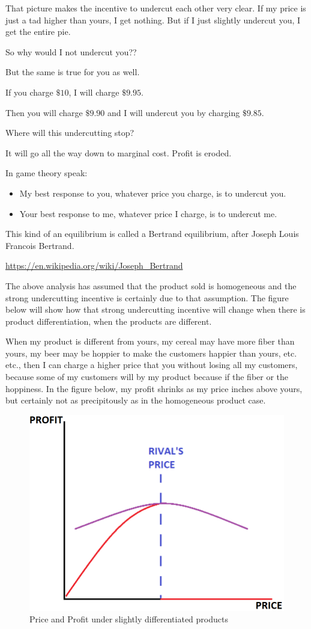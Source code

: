 \documentclass[
]{book}
\providecommand{\tightlist}{%
  \setlength{\itemsep}{0pt}\setlength{\parskip}{0pt}}
\begin{document}
That picture makes the incentive to undercut each other very clear. If my price is just a tad higher than yours, I get nothing. But if I just slightly undercut you, I get the entire pie.

So why would I not undercut you??

But the same is true for you as well.

If you charge \(\$10\), I will charge \(\$9.95\).

Then you will charge \(\$9.90\) and I will undercut you by charging \(\$9.85\).

Where will this undercutting stop?

It will go all the way down to marginal cost. Profit is eroded.

In game theory speak:

\begin{itemize}
\tightlist
\item
  My best response to you, whatever price you charge, is to undercut you.
\item
  Your best response to me, whatever price I charge, is to undercut me.
\end{itemize}

This kind of an equilibrium is called a Bertrand equilibrium, after Joseph Louis Francois Bertrand.

\url{https://en.wikipedia.org/wiki/Joseph_Bertrand}

The above analysis has assumed that the product sold is homogeneous and the strong undercutting incentive is certainly due to that assumption. The figure below will show how that strong undercutting incentive will change when there is product differentiation, when the products are different.

When my product is different from yours, my cereal may have more fiber than yours, my beer may be hoppier to make the customers happier than yours, etc. etc., then I can charge a higher price that you without losing all my customers, because some of my customers will by my product because if the fiber or the hoppiness. In the figure below, my profit shrinks as my price inches above yours, but certainly not as precipitously as in the homogeneous product case.

\begin{figure}

{\centering \includegraphics[width=0.5\linewidth]{img/oligopoly/fig7} 

}

\caption{Price and Profit under slightly differentiated products}\label{fig:oligopoly07}
\end{figure}
\end{document}
